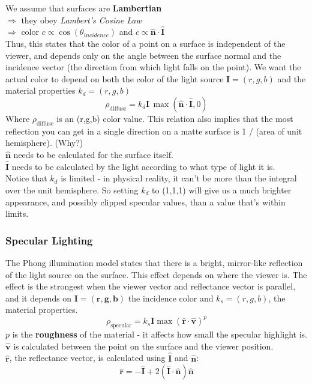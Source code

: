 \documentclass[]{article}
\begin{document}
We assume that surfaces are \textbf{Lambertian} \\
$\Longrightarrow$ they obey \emph{Lambert's Cosine Law} \\
$\Longrightarrow$ color $c \propto \cos(\theta_{incidence})$ and $c \propto \hat{\mathbf{n}} \cdot \hat{\mathbf{I}}$ \\

Thus, this states that the color of a point on a surface is independent of the viewer, and depends only on the angle between the surface normal and the incidence vector (the direction from which light falls on the point). We want the actual color to depend on both the color of the light source $\mathbf{I} = (r,g,b)$ and the material properties $k_{d} = (r,g,b)$
\begin{equation}
    \rho_{\text{diffuse}} = k_{d}\mathbf{I}\,\max(\hat{\mathbf{n}} \cdot \hat{\mathbf{I}}, 0)
\end{equation}
Where $\rho_{\text{diffuse}}$ is an (r,g,b) color value. This relation also implies that the most reflection you can get in a single direction on a matte surface is 1 / (area of unit hemisphere). (Why?)
\\ $\hat{\mathbf{n}}$ needs to be calculated for the surface itself.
\\ $\hat{\mathbf{I}}$ needs to be calculated by the light according to what type of light it is.
\\ Notice that $k_{d}$ is limited - in physical reality, it can't be more than the integral over the unit hemisphere. So setting $k_{d}$ to (1,1,1) will give us a much brighter appearance, and possibly clipped specular values, than a value that's within limits.
 

\subsubsection{Specular Lighting}

The Phong illumination model states that there is a bright, mirror-like reflection of the light source on the surface. This effect depends on where the viewer is. The effect is the strongest when the viewer vector and reflectance vector is parallel, and it depends on $\mathbf{I = (r,g,b)}$ the incidence color and $k_{s} = (r,g,b)$, the material properties.
\begin{equation}
    \rho_{\text{specular}} = k_{s} \mathbf{I} \max(\hat{\mathbf{r}} \cdot \hat{\mathbf{v}})^{p}
\end{equation}
$p$ is the \textbf{roughness} of the material - it affects how small the specular highlight is.
\\ $\hat{\mathbf{v}}$ is calculated between the point on the surface and the viewer position.
\\ $\hat{\mathbf{r}}$, the reflectance vector, is calculated using $\hat{\mathbf{I}}$ and $\hat{\mathbf{n}}$:
\begin{equation}
    \hat{\mathbf{r}} = -\hat{\mathbf{I}} +2(\hat{\mathbf{I}} \cdot \hat{\mathbf{n}})\hat{\mathbf{n}}
\end{equation}
\end{document}
